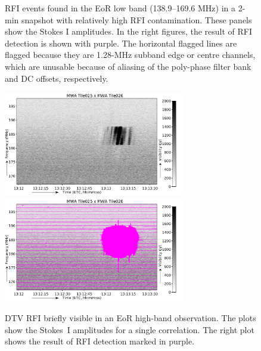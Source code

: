 \documentclass{pasa}
\begin{document}
\begin{figure}
{\label{fig:150_2}
}%
\caption{RFI events found in the EoR low band (138.9--169.6 MHz) in a 2-min snapshot with relatively high RFI contamination. These panels show the Stokes I amplitudes. In the right figures, the result of RFI detection is shown with purple. The horizontal flagged lines are flagged because they are 1.28-MHz subband edge or centre channels, which are unusable because of aliasing of the poly-phase filter bank and DC offsets, respectively.}
\label{fig:2m-amateur-band}
\end{figure}

\noindent\begin{figure}%
\begin{center}\hspace*{-0.2cm}\includegraphics[width=8cm]{img/EoR-high-band-DVB-burst-example-noflags}\includegraphics[width=8cm]{img/EoR-high-band-DVB-burst-example-withflags}
\end{center}
\caption{DTV RFI briefly visible in an EoR high-band observation. The plots show the Stokes~I amplitudes for a single correlation. The right plot shows the result of RFI detection marked in purple.}
\label{fig:dvb-burst}
\end{figure}
\end{document}
